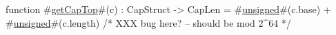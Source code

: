 function #\hyperref[zgetCapTop]{getCapTop}#(c)    : CapStruct -> CapLen = #\hyperref[zunsigned]{unsigned}#(c.base) + #\hyperref[zunsigned]{unsigned}#(c.length) /* XXX bug here? -- should be mod 2^64 */
